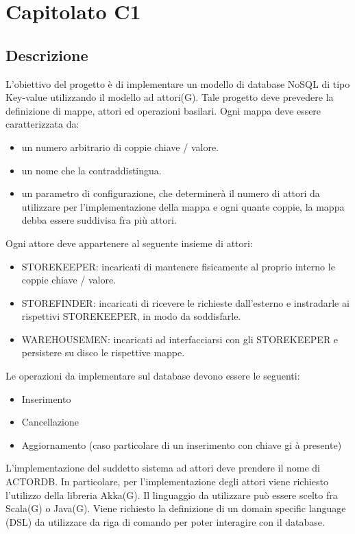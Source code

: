 \section{Capitolato C1}
\subsection{Descrizione}
L'obiettivo del progetto è di implementare un modello di database NoSQL di tipo Key-value utilizzando il modello ad attori(G).
Tale progetto deve prevedere la definizione di mappe, attori ed operazioni basilari. 
Ogni mappa deve essere caratterizzata da:
\begin{itemize}
\item
un numero arbitrario di coppie chiave / valore. 
\item 
un nome che la contraddistingua. 
\item
un parametro di configurazione, che determinerà il numero di attori da utilizzare per l'implementazione della mappa e ogni quante coppie, la mappa debba essere suddivisa fra più attori.
\end{itemize}
Ogni attore deve appartenere al seguente insieme di attori:
\begin{itemize}
\item
STOREKEEPER: incaricati di mantenere fisicamente al proprio interno le coppie chiave / valore.
\item
STOREFINDER: incaricati di ricevere le richieste dall’esterno e instradarle ai 
rispettivi STOREKEEPER, in modo da soddisfarle. 
\item
WAREHOUSEMEN: incaricati ad interfacciarsi con gli STOREKEEPER e persistere su disco le rispettive mappe.
\end{itemize}

Le operazioni da implementare sul database devono essere le seguenti: 
\begin{itemize}
\item
Inserimento
\item
Cancellazione 
\item
Aggiornamento (caso particolare di un inserimento con chiave gi
à presente) 
\end{itemize}

L'implementazione del suddetto sistema ad attori deve prendere il nome di ACTORDB. In particolare, per l'implementazione degli attori viene richiesto l'utilizzo della libreria Akka(G).
Il linguaggio da utilizzare può essere scelto fra Scala(G) o Java(G). 
Viene richiesto la definizione di un domain specific language (DSL) da utilizzare da riga di comando per poter interagire con il database.

